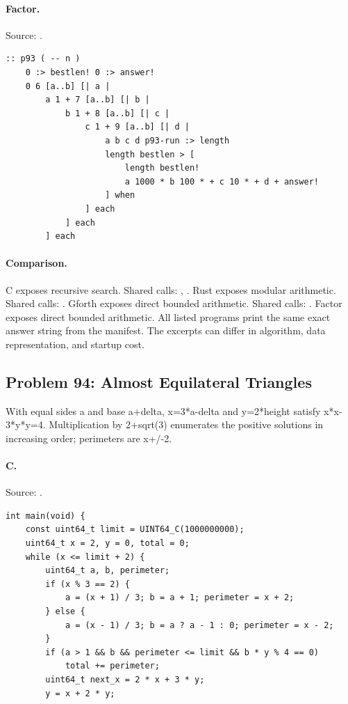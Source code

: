 \paragraph{Factor.} Source: .
\begin{lstlisting}
:: p93 ( -- n )
    0 :> bestlen! 0 :> answer!
    0 6 [a..b] [| a |
        a 1 + 7 [a..b] [| b |
            b 1 + 8 [a..b] [| c |
                c 1 + 9 [a..b] [| d |
                    a b c d p93-run :> length
                    length bestlen > [
                        length bestlen!
                        a 1000 * b 100 * + c 10 * + d + answer!
                    ] when
                ] each
            ] each
        ] each
\end{lstlisting}

\paragraph{Comparison.}
C exposes recursive search. Shared calls: \texttt{}, \texttt{}. Rust exposes modular arithmetic. Shared calls: \texttt{}. Gforth exposes direct bounded arithmetic. Shared calls: \texttt{}. Factor exposes direct bounded arithmetic.
All listed programs print the same exact answer string from the manifest. The excerpts can differ in algorithm, data representation, and startup cost.

\subsection{Problem 94: Almost Equilateral Triangles}
\label{walkthrough:p94}
With equal sides a and base a+delta, x=3*a-delta and y=2*height satisfy x*x-3*y*y=4. Multiplication by 2+sqrt(3) enumerates the positive solutions in increasing order; perimeters are x+/-2.

\paragraph{C.} Source: .
\begin{lstlisting}
int main(void) {
    const uint64_t limit = UINT64_C(1000000000);
    uint64_t x = 2, y = 0, total = 0;
    while (x <= limit + 2) {
        uint64_t a, b, perimeter;
        if (x % 3 == 2) {
            a = (x + 1) / 3; b = a + 1; perimeter = x + 2;
        } else {
            a = (x - 1) / 3; b = a ? a - 1 : 0; perimeter = x - 2;
        }
        if (a > 1 && b && perimeter <= limit && b * y % 4 == 0)
            total += perimeter;
        uint64_t next_x = 2 * x + 3 * y;
        y = x + 2 * y;
\end{lstlisting}


